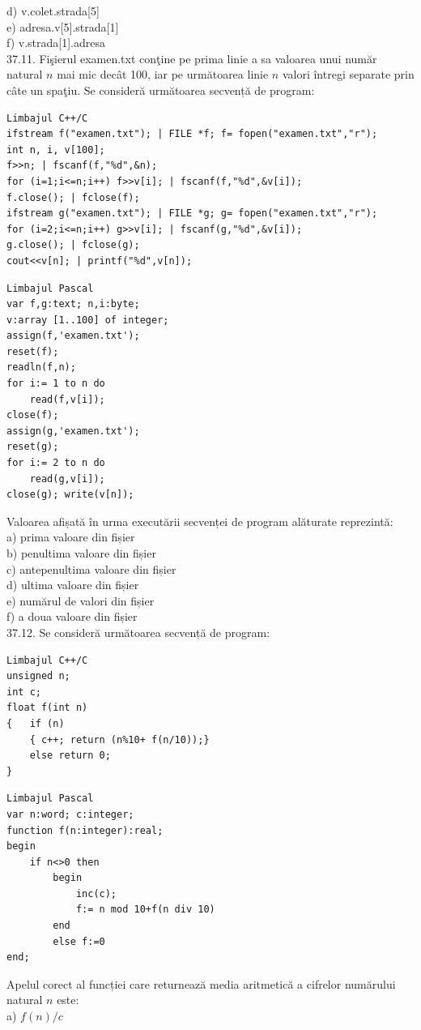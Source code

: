 \begin{itemize}
\begin{enumerate}
d) v.colet.strada[5]
\\
e) adresa.v[5].strada[1]
\\
f) v.strada[1].adresa
\\
37.11. Fişierul examen.txt conţine pe prima linie a sa valoarea unui număr natural $n$ mai mic decât 100, iar pe următoarea linie $n$ valori întregi separate prin câte un spaţiu. Se consideră următoarea secvență de program:
\begin{verbatim}
Limbajul C++/C
ifstream f("examen.txt"); | FILE *f; f= fopen("examen.txt","r");
int n, i, v[100];
f>>n; | fscanf(f,"%d",&n);
for (i=1;i<=n;i++) f>>v[i]; | fscanf(f,"%d",&v[i]);
f.close(); | fclose(f);
ifstream g("examen.txt"); | FILE *g; g= fopen("examen.txt","r");
for (i=2;i<=n;i++) g>>v[i]; | fscanf(g,"%d",&v[i]);
g.close(); | fclose(g);
cout<<v[n]; | printf("%d",v[n]);
\end{verbatim}
\begin{verbatim}
Limbajul Pascal
var f,g:text; n,i:byte;
v:array [1..100] of integer;
assign(f,'examen.txt');
reset(f);
readln(f,n);
for i:= 1 to n do
    read(f,v[i]);
close(f);
assign(g,'examen.txt');
reset(g);
for i:= 2 to n do
    read(g,v[i]);
close(g); write(v[n]);
\end{verbatim}
Valoarea afișată în urma executării secvenței de program alăturate reprezintă:
\\
a) prima valoare din fișier
\\
b) penultima valoare din fișier
\\
c) antepenultima valoare din fișier
\\
d) ultima valoare din fișier
\\
e) numărul de valori din fișier
\\
f) a doua valoare din fișier
\\
37.12. Se consideră următoarea secvență de program:
\begin{verbatim}
Limbajul C++/C
unsigned n;
int c;
float f(int n)
{   if (n)
    { c++; return (n%10+ f(n/10));}
    else return 0;
}
\end{verbatim}
\begin{verbatim}
Limbajul Pascal
var n:word; c:integer;
function f(n:integer):real;
begin
    if n<>0 then
        begin
            inc(c);
            f:= n mod 10+f(n div 10)
        end
        else f:=0
end;
\end{verbatim}
Apelul corect al funcției care returnează media aritmetică a cifrelor numărului natural $n$ este:
\\
a) $f(n) / c$
\\

\end{enumerate}
\end{itemize}
